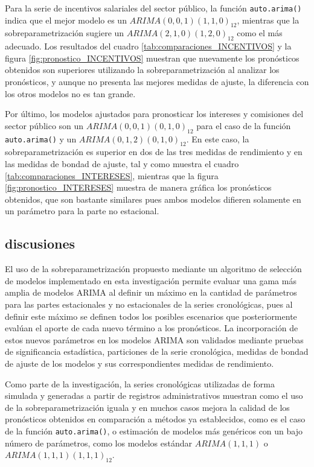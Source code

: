 \documentclass[
]{article}
\begin{document}
Para la serie de incentivos salariales del sector público, la función
\texttt{auto.arima()} indica que el mejor modelo es un
\(ARIMA(0,0,1)(1,1,0)_{12}\), mientras que la sobreparametrización
sugiere un \(ARIMA(2,1,0)(1,2,0)_{12}\) como el más adecuado. Los
resultados del cuadro \ref{tab:comparaciones_INCENTIVOS} y la figura
\ref{fig:pronostico_INCENTIVOS} muestran que nuevamente los pronósticos
obtenidos son superiores utilizando la sobreparametrización al analizar
los pronósticos, y aunque no presenta las mejores medidas de ajuste, la
diferencia con los otros modelos no es tan grande.

Por último, los modelos ajustados para pronosticar los intereses y
comisiones del sector público son un \(ARIMA(0,0,1)(0,1,0)_{12}\) para
el caso de la función \texttt{auto.arima()} y un
\(ARIMA(0,1,2)(0,1,0)_{12}\). En este caso, la sobreparametrización es
superior en dos de las tres medidas de rendimiento y en las medidas de
bondad de ajuste, tal y como muestra el cuadro
\ref{tab:comparaciones_INTERESES}, mientras que la figura
\ref{fig:pronostico_INTERESES} muestra de manera gráfica los pronósticos
obtenidos, que son bastante similares pues ambos modelos difieren
solamente en un parámetro para la parte no estacional.

\subsection{discusiones}

El uso de la sobreparametrización propuesto mediante un algoritmo de
selección de modelos implementado en esta investigación permite evaluar
una gama más amplia de modelos ARIMA al definir un máximo en la cantidad
de parámetros para las partes estacionales y no estacionales de la
series cronológicas, pues al definir este máximo se definen todos los
posibles escenarios que posteriormente evalúan el aporte de cada nuevo
término a los pronósticos. La incorporación de estos nuevos parámetros
en los modelos ARIMA son validados mediante pruebas de significancia
estadística, particiones de la serie cronológica, medidas de bondad de
ajuste de los modelos y sus correspondientes medidas de rendimiento.

Como parte de la investigación, la series cronológicas utilizadas de
forma simulada y generadas a partir de registros administrativos
muestran como el uso de la sobreparametrización iguala y en muchos casos
mejora la calidad de los pronósticos obtenidos en comparación a métodos
ya establecidos, como es el caso de la función \texttt{auto.arima()}, o
estimación de modelos más genéricos con un bajo número de parámetros,
como los modelos estándar \(ARIMA(1,1,1)\) o
\(ARIMA(1,1,1)(1,1,1)_{12}\).
\end{document}
